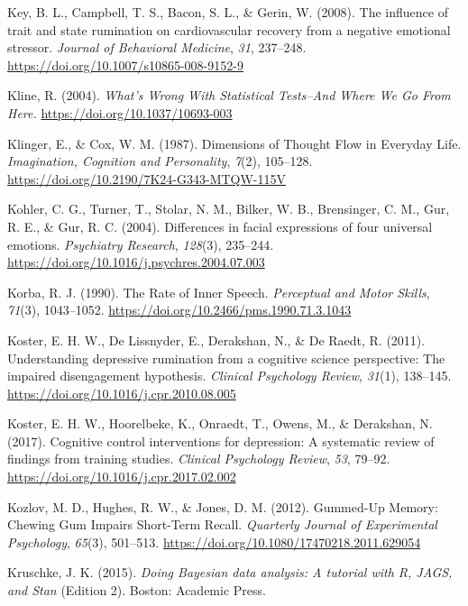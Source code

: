 \documentclass[a4paper,12pt,twoside,openright,oldfontcommands,final]{memoir}
\begin{document}
\leavevmode\hypertarget{ref-Key2008}{}%
Key, B. L., Campbell, T. S., Bacon, S. L., \& Gerin, W. (2008). The influence of trait and state rumination on cardiovascular recovery from a negative emotional stressor. \emph{Journal of Behavioral Medicine}, \emph{31}, 237--248. \url{https://doi.org/10.1007/s10865-008-9152-9}

\leavevmode\hypertarget{ref-Kline2004}{}%
Kline, R. (2004). \emph{What's Wrong With Statistical Tests--And Where We Go From Here.} \url{https://doi.org/10.1037/10693-003}

\leavevmode\hypertarget{ref-klinger_dimensions_1987}{}%
Klinger, E., \& Cox, W. M. (1987). Dimensions of Thought Flow in Everyday Life. \emph{Imagination, Cognition and Personality}, \emph{7}(2), 105--128. \url{https://doi.org/10.2190/7K24-G343-MTQW-115V}

\leavevmode\hypertarget{ref-kohler_differences_2004}{}%
Kohler, C. G., Turner, T., Stolar, N. M., Bilker, W. B., Brensinger, C. M., Gur, R. E., \& Gur, R. C. (2004). Differences in facial expressions of four universal emotions. \emph{Psychiatry Research}, \emph{128}(3), 235--244. \url{https://doi.org/10.1016/j.psychres.2004.07.003}

\leavevmode\hypertarget{ref-korba_rate_1990}{}%
Korba, R. J. (1990). The Rate of Inner Speech. \emph{Perceptual and Motor Skills}, \emph{71}(3), 1043--1052. \url{https://doi.org/10.2466/pms.1990.71.3.1043}

\leavevmode\hypertarget{ref-Koster2011}{}%
Koster, E. H. W., De Lissnyder, E., Derakshan, N., \& De Raedt, R. (2011). Understanding depressive rumination from a cognitive science perspective: The impaired disengagement hypothesis. \emph{Clinical Psychology Review}, \emph{31}(1), 138--145. \url{https://doi.org/10.1016/j.cpr.2010.08.005}

\leavevmode\hypertarget{ref-koster_cognitive_2017}{}%
Koster, E. H. W., Hoorelbeke, K., Onraedt, T., Owens, M., \& Derakshan, N. (2017). Cognitive control interventions for depression: A systematic review of findings from training studies. \emph{Clinical Psychology Review}, \emph{53}, 79--92. \url{https://doi.org/10.1016/j.cpr.2017.02.002}

\leavevmode\hypertarget{ref-kozlov_gummed-up_2012}{}%
Kozlov, M. D., Hughes, R. W., \& Jones, D. M. (2012). Gummed-Up Memory: Chewing Gum Impairs Short-Term Recall. \emph{Quarterly Journal of Experimental Psychology}, \emph{65}(3), 501--513. \url{https://doi.org/10.1080/17470218.2011.629054}

\leavevmode\hypertarget{ref-kruschke_doing_2015}{}%
Kruschke, J. K. (2015). \emph{Doing Bayesian data analysis: A tutorial with R, JAGS, and Stan} (Edition 2). Boston: Academic Press.
\end{document}
